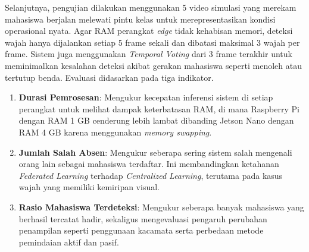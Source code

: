 \begin{enumerate}
  Selanjutnya, pengujian dilakukan menggunakan 5 video simulasi yang merekam mahasiswa berjalan melewati pintu kelas untuk merepresentasikan kondisi operasional nyata. Agar RAM perangkat \textit{edge} tidak kehabisan memori, deteksi wajah hanya dijalankan setiap 5 frame sekali dan dibatasi maksimal 3 wajah per frame. Sistem juga menggunakan \textit{Temporal Voting} dari 3 frame terakhir untuk meminimalkan kesalahan deteksi akibat gerakan mahasiswa seperti menoleh atau tertutup benda. Evaluasi didasarkan pada tiga indikator.
  \begin{enumerate}
    \item \textbf{Durasi Pemrosesan}: Mengukur kecepatan inferensi sistem di setiap perangkat untuk melihat dampak keterbatasan RAM, di mana Raspberry Pi dengan RAM 1 GB cenderung lebih lambat dibanding Jetson Nano dengan RAM 4 GB karena menggunakan \textit{memory swapping}.
    \item \textbf{Jumlah Salah Absen}: Mengukur seberapa sering sistem salah mengenali orang lain sebagai mahasiswa terdaftar. Ini membandingkan ketahanan \textit{Federated Learning} terhadap \textit{Centralized Learning}, terutama pada kasus wajah yang memiliki kemiripan visual.
    \item \textbf{Rasio Mahasiswa Terdeteksi}: Mengukur seberapa banyak mahasiswa yang berhasil tercatat hadir, sekaligus mengevaluasi pengaruh perubahan penampilan seperti penggunaan kacamata serta perbedaan metode pemindaian aktif dan pasif.
  \end{enumerate}
\end{enumerate}


